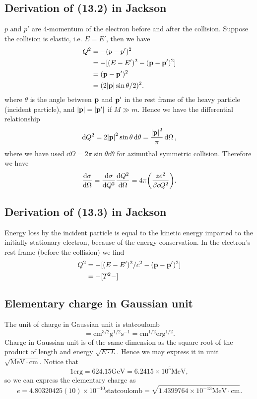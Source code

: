 \documentclass[10pt]{article}
\begin{document}
\subsection{Derivation of (13.2) in Jackson}
$p$ and $p'$ are 4-momentum of the electron before and after the collision. Suppose the collision is elastic, i.e. $E = E'$, then we have
\begin{align*}
	Q^2 &= - (p - p')^2 \\
	&= -[(E - E')^2 - (\vb{p} - \vb{p'})^2] \\
	&= (\vb{p} - \vb{p'})^2 \\
	&= (2 \abs{\vb{p}} \sin{\theta/2})^2.
\end{align*}
where $\theta$ is the angle between $\vb{p}$ and $\vb{p'}$ in the rest frame of the heavy particle (incident particle), and $\abs{\vb{p}} = \abs{\vb{p'}}$ if $M \gg m$. Hence we have the differential relationship
\begin{equation}
	\dd{Q^2} = 2 \abs{\vb{p}}^2 \sin{\theta} \dd{\theta} = \frac{\abs{\vb{p}}^2}{\pi} \dd{\Omega},
\end{equation}
where we have used $\dd{\Omega} = 2\pi \sin{\theta} \dd{\theta}$ for azimuthal symmetric collision. Therefore we have
\begin{align*}
	\dv{\sigma}{\Omega} = \dv{\sigma}{Q^2} \dv{Q^2}{\Omega} = 4 \pi \qty(\frac{ze^2}{\beta c Q^2}).
\end{align*}

\subsection{Derivation of (13.3) in Jackson}
Energy loss by the incident particle is equal to the kinetic energy imparted to the initially stationary electron, because of the energy conservation. In the electron's rest frame (before the collision) we find
\begin{align*}
	Q^2 &= -[(E - E')^2/c^2 - (\vb{p} - \vb{p'})^2]\\
	&= -[T^2 - ]
\end{align*}

\subsection{Elementary charge in Gaussian unit}
The unit of charge in Gaussian unit is statcoulomb
\begin{equation}
	[charge] = \mathrm{cm}^{3/2} \mathrm{g}^{1/2} \mathrm{s}^{-1} = \mathrm{cm}^{1/2} \mathrm{erg}^{1/2}.
\end{equation}
Charge in Gaussian unit is of the same dimension as the square root of the product of length and energy $\sqrt{E \cdot L}$. Hence we may express it in unit $\sqrt{\mathrm{MeV} \cdot \mathrm{cm}}$. Notice that
\begin{equation}
	1 \mathrm{erg} = 624.15 \mathrm{GeV} = 6.2415 \times 10^{5} \mathrm{MeV},
\end{equation}
so we can express the elementary charge as
\begin{equation}
	e = 4.80320425(10)\times10^{-10} \mathrm{statcoulomb} = \sqrt{1.4399764 \times 10^{-13} \mathrm{MeV} \cdot \mathrm{cm}}.
\end{equation}
\end{document}
